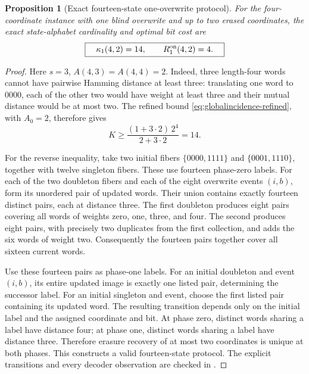 \documentclass[11pt,a4paper]{article}
\newtheorem{proposition}[theorem]{Proposition}
\begin{document}
\begin{proposition}[Exact fourteen-state one-overwrite protocol]\label{prop:fourteen}
For the four-coordinate instance with one blind overwrite and up to two erased coordinates, the exact state-alphabet cardinality and optimal bit cost are
\[
  \boxed{\quad\kappa_1(4,2)=14,\qquad R_1^{\rm on}(4,2)=4.\quad}
\]
\end{proposition}
\begin{proof}
Here $s=3$, $A(4,3)=A(4,4)=2$. Indeed, three length-four words cannot have pairwise Hamming distance at least three: translating one word to $0000$, each of the other two would have weight at least three and their mutual distance would be at most two. The refined bound \eqref{eq:globalincidence-refined}, with $A_0=2$, therefore gives
\[
  K\ge \frac{(1+3\cdot2)\,2^4}{2+3\cdot2}=14.
\]

For the reverse inequality, take two initial fibers $\{0000,1111\}$ and $\{0001,1110\}$, together with twelve singleton fibers. These use fourteen phase-zero labels. For each of the two doubleton fibers and each of the eight overwrite events $(i,b)$, form its unordered pair of updated words. Their union contains exactly fourteen distinct pairs, each at distance three. The first doubleton produces eight pairs covering all words of weights zero, one, three, and four. The second produces eight pairs, with precisely two duplicates from the first collection, and adds the six words of weight two. Consequently the fourteen pairs together cover all sixteen current words.

Use these fourteen pairs as phase-one labels. For an initial doubleton and event $(i,b)$, its entire updated image is exactly one listed pair, determining the successor label. For an initial singleton and event, choose the first listed pair containing its updated word. The resulting transition depends only on the initial label and the assigned coordinate and bit. At phase zero, distinct words sharing a label have distance four; at phase one, distinct words sharing a label have distance three. Therefore erasure recovery of at most two coordinates is unique at both phases. This constructs a valid fourteen-state protocol. The explicit transitions and every decoder observation are checked in .
\end{proof}
\end{document}
